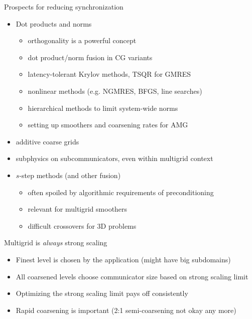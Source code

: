 \documentclass{beamer}
\begin{document}
\begin{frame}{Prospects for reducing synchronization}
  \begin{itemize}
  \item Dot products and norms
    \begin{itemize}
    \item orthogonality is a powerful concept
    \item dot product/norm fusion in CG variants
    \item latency-tolerant Krylov methods, TSQR for GMRES
    \item nonlinear methods (e.g. NGMRES, BFGS, line searches)
    \item hierarchical methods to limit system-wide norms
    \item setting up smoothers and coarsening rates for AMG
    \end{itemize}
  \item additive coarse grids
  \item subphysics on subcommunicators, even within multigrid context
  \item $s$-step methods (and other fusion)
    \begin{itemize}
    \item often spoiled by algorithmic requirements of preconditioning
    \item relevant for multigrid smoothers
    \item difficult crossovers for 3D problems
    \end{itemize}
  \end{itemize}
\end{frame}


\begin{frame}{Multigrid is \emph{always} strong scaling}
  \begin{itemize}
  \item Finest level is chosen by the application (might have big subdomains)
  \item All coarsened levels choose communicator size based on strong scaling limit
  \item Optimizing the strong scaling limit pays off consistently
  \item Rapid coarsening is important (2:1 semi-coarsening not okay any more)
  \end{itemize}
\end{frame}
\end{document}
